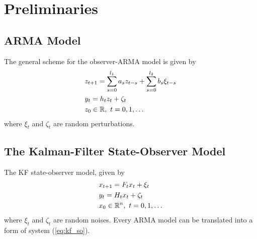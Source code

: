 \section{Preliminaries}\label{sec:pre}
\subsection{ARMA Model}
The general scheme for the observer-ARMA model is given by
\begin{equation}
  \begin{split}
    &z_{t+1}=\sum_{s=0}^{l_1}a_sz_{t-s}+\sum_{s=0}^{l_2}b_s\xi_{t-s}\\
    &y_t=h_tz_t+\zeta_t\\
    &z_0\in{\mathbb{R}}, \ t=0,1,\dots
  \end{split}
\end{equation}
where $\xi_t$ and $\zeta_t$ are random perturbations.

\subsection{The Kalman-Filter State-Observer Model}
The KF state-observer model, given by
\begin{equation}\label{eq:kf_so}
  \begin{split}
    &x_{t+1}=F_tx_t + \xi_t\\
    &y_t=H_tx_t+\zeta_t\\
    &x_0\in\R^n, \ t=0,1,\dots
  \end{split}
\end{equation}
where $\xi_t$ and $\zeta_t$ are random noises. Every ARMA model can be translated into a form of system (\ref{eq:kf_so}).



